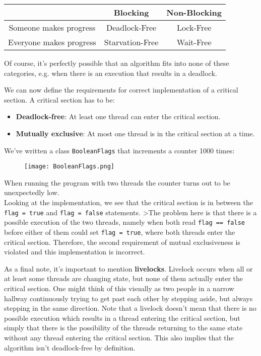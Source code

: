 \documentclass[main]{subfiles}
\begin{document}
\begin{center}
    \begin{tabular}{c|c|c}
         &  Blocking & Non-Blocking\\
         \hline
        Someone makes progress & Deadlock-Free & Lock-Free \\
        \hline
        Everyone makes progress & Starvation-Free & Wait-Free
    \end{tabular}
\end{center}
\noindent Of course, it's perfectly possible that an algorithm fits into none of these categories, e.g. when there is an execution that results in a deadlock.\clearpage

\noindent We can now define the requirements for correct implementation of a critical section. A critical section has to be:
\begin{itemize}
    \item \textbf{Deadlock-free}: At least one thread can enter the critical section.
    \item \textbf{Mutually exclusive}: At most one thread is in the critical section at a time.
\end{itemize}

\begin{example}
    We've written a class \texttt{BooleanFlags} that increments a counter 1000 times:
    \begin{figure}[H]
        \centering
        \texttt{[image: BooleanFlags.png]}
    \end{figure}
    \noindent When running the program with two threads the counter turns out to be unexpectedly low.\\[3mm]
    Looking at the implementation, we see that the critical section is in between the \texttt{flag = true} and \texttt{flag = false} statements. >The problem here is that there is a possible execution of the two threads, namely when both read \texttt{flag == false} before either of them could set \texttt{flag = true}, where both threads enter the critical section. Therefore, the second requirement of mutual exclusiveness is violated and this implementation is incorrect. 
\end{example}

\noindent As a final note, it's important to mention \textbf{livelocks}. Livelock occurs when all or at least some threads are changing state, but none of them actually enter the critical section. One might think of this visually as two people in a narrow hallway continuously trying to get past each other by stepping aside, but always stepping in the same direction. Note that a livelock doesn't mean that there is no possible execution which results in a thread entering the critical section, but simply that there is the possibility of the threads returning to the same state without any thread entering the critical section. This also implies that the algorithm isn't deadlock-free by definition.\\
\end{document}

